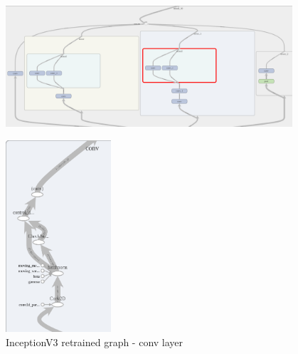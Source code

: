 \begin{figure}
\includegraphics[width=0.95\textwidth]{includes/graphInception4000MixedLayer}
\end{figure}
\newpage

\begin{figure}[htbp]
\centering
\includegraphics[width=0.35\textwidth]{includes/graphInception4000ConvOps1}
\caption{InceptionV3 retrained graph - conv layer}
\label{fig:InceptionV3 retrained graph - conv layer}
\end{figure}
\newpage


